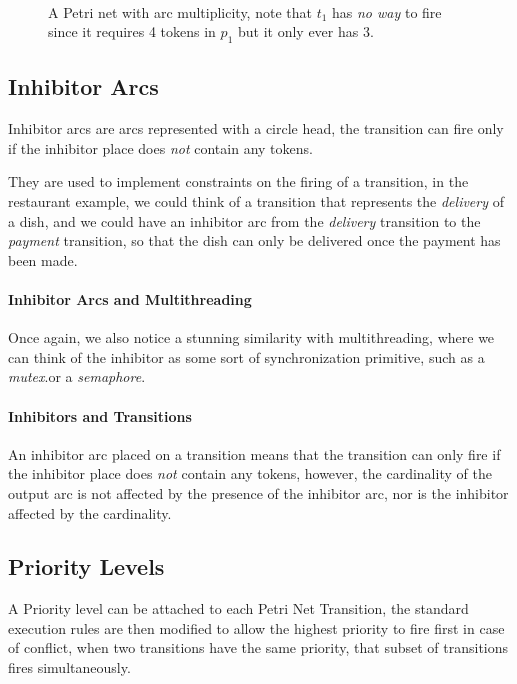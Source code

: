 \documentclass[openright, twoside, twocolumn]{report}
\newcommand{\incsvg}[2]{%
	\def\svgwidth{\columnwidth}
	\graphicspath{{#1}}
	
}
\begin{document}
    \begin{figure}[ht]
	\centering
	\incsvg{fig}{fig/pnet-arc-mult}\\
	\caption{A Petri net with arc multiplicity, note that $ t_1$ has \emph{no way} to fire since it requires
  4 tokens in $ p_1$ but it only ever has $3$. }
	\label{fig:pnet-arc-mult}
\end{figure}

    \subsection{Inhibitor Arcs}
    Inhibitor arcs are arcs represented with a circle head, the transition can fire only if the inhibitor place
    does \emph{not} contain any tokens.

    They are used to implement constraints on the firing of a transition, in the restaurant example, we
    could think of a transition that represents the \emph{delivery} of a dish, and we could have an inhibitor
    arc from the \emph{delivery} transition to the \emph{payment} transition, so that the dish can only be
    delivered once the payment has been made.


    \paragraph{Inhibitor Arcs and Multithreading}
    Once again, we also notice a stunning similarity with multithreading, where we can think of the inhibitor
    as some sort of synchronization primitive, such as a \emph{mutex}.or a \emph{semaphore}.

    \paragraph{Inhibitors and Transitions}
    An inhibitor arc placed on a transition means that the transition can only fire if the inhibitor place
    does \emph{not} contain any tokens, however, the cardinality of the output arc is not affected by the
    presence of the inhibitor arc, nor is the inhibitor affected by the cardinality.

    \subsection{Priority Levels}

    A Priority level can be attached to each Petri Net Transition, the standard execution rules are then modified
    to allow the highest priority to fire first in case of conflict, when two transitions have the same priority,
    that subset of transitions fires simultaneously.
\end{document}
